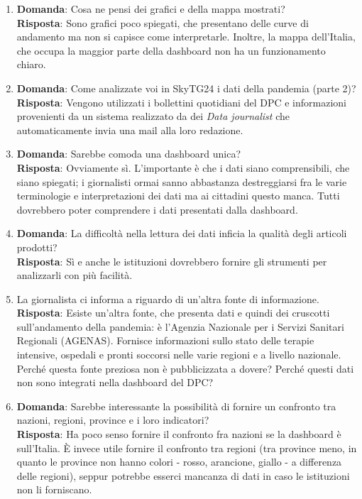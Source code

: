 \begin{enumerate}
    \item \textbf{Domanda}: Cosa ne pensi dei grafici e della mappa mostrati?\\\textbf{Risposta}: Sono grafici poco spiegati, che presentano delle curve di andamento ma non si capisce come interpretarle. Inoltre, la mappa dell'Italia, che occupa la maggior parte della dashboard non ha un funzionamento chiaro.
    \item \textbf{Domanda}: Come analizzate voi in SkyTG24 i dati della pandemia (parte 2)?\\\textbf{Risposta}: Vengono utilizzati i bollettini quotidiani del DPC e informazioni provenienti da un sistema realizzato da dei \textit{Data journalist} che automaticamente invia una mail alla loro redazione.
    \item \textbf{Domanda}: Sarebbe comoda una dashboard unica?\\\textbf{Risposta}: Ovviamente sì. L'importante è che i dati siano comprensibili, che siano spiegati; i giornalisti ormai sanno abbastanza destreggiarsi fra le varie terminologie e interpretazioni dei dati ma ai cittadini questo manca. Tutti dovrebbero poter comprendere i dati presentati dalla dashboard.
    \item \textbf{Domanda}: La difficoltà nella lettura dei dati inficia la qualità degli articoli prodotti?\\\textbf{Risposta}: Sì e anche le istituzioni dovrebbero fornire gli strumenti per analizzarli con più facilità.
    \item La giornalista ci informa a riguardo di un'altra fonte di informazione.\\\textbf{Risposta}: Esiste un'altra fonte, che presenta dati e quindi dei cruscotti sull'andamento della pandemia: è l'Agenzia Nazionale per i Servizi Sanitari Regionali (AGENAS). Fornisce informazioni sullo stato delle terapie intensive, ospedali e pronti soccorsi nelle varie regioni e a livello nazionale. Perché questa fonte preziosa non è pubblicizzata a dovere? Perché questi dati non sono integrati nella dashboard del DPC?
    \item \textbf{Domanda}: Sarebbe interessante la possibilità di fornire un confronto tra nazioni, regioni, province e i loro indicatori?\\\textbf{Risposta}: Ha poco senso fornire il confronto fra nazioni se la dashboard è sull'Italia. È invece utile fornire il confronto tra regioni (tra province meno, in quanto le province non hanno colori - rosso, arancione, giallo - a differenza delle regioni), seppur potrebbe esserci mancanza di dati in caso le istituzioni non li forniscano.

\end{enumerate}
